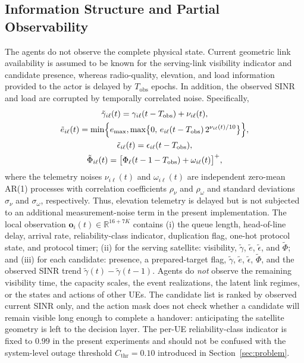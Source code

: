 \documentclass[journal]{IEEEtran}
\begin{document}
\subsection{Information Structure and Partial Observability}
\label{sec:obs}

The agents do not observe the complete physical state. Current geometric link
availability is assumed to be known for the serving-link visibility indicator
and candidate presence, whereas radio-quality, elevation, and load information
provided to the actor is delayed by $T_{\mathrm{obs}}$ epochs. In addition,
the observed SINR and load are corrupted by temporally correlated noise.
Specifically,
\begin{gather}
\tilde\gamma_{i\ell}(t)=\gamma_{i\ell}(t-T_{\mathrm{obs}})+\nu_{i\ell}(t),
\label{eq:telemetry}\\
\tilde e_{i\ell}(t)=\min\!\Big\{e_{\max},\max\!\big\{0,\,e_{i\ell}(t-T_{\mathrm{obs}})\,2^{\nu_{i\ell}(t)/10}\big\}\Big\},\notag\\
\tilde\epsilon_{i\ell}(t)=\epsilon_{i\ell}(t-T_{\mathrm{obs}}),\notag\\
\tilde\Phi_{i\ell}(t)=\big[\Phi_\ell(t-1-T_{\mathrm{obs}})+\omega_{i\ell}(t)\big]^+,\notag
\end{gather}
where the telemetry noises $\nu_{i\ell}(t)$ and $\omega_{i\ell}(t)$ are
independent zero-mean AR(1) processes with correlation coefficients
$\rho_\nu$ and $\rho_\omega$ and standard deviations $\sigma_\nu$ and
$\sigma_\omega$, respectively. Thus, elevation telemetry is delayed but is not
subjected to an additional measurement-noise term in the present
implementation. The local observation $\mathbf{o}_i(t)\in\mathbb{R}^{16+7K}$
contains (i) the queue length, head-of-line delay, arrival rate,
reliability-class indicator, duplication flag, one-hot protocol state, and
protocol timer; (ii) for the serving satellite: visibility, $\tilde\gamma$,
$\tilde e$, $\tilde\epsilon$, and $\tilde\Phi$; and (iii) for each candidate:
presence, a prepared-target flag, $\tilde\gamma$, $\tilde e$,
$\tilde\epsilon$, $\tilde\Phi$, and the observed SINR trend
$\tilde\gamma(t)-\tilde\gamma(t-1)$. Agents do \emph{not} observe the
remaining visibility time, the capacity scales, the event realizations, the
latent link regimes, or the states and actions of other UEs. The candidate
list is ranked by observed current SINR only, and the action mask does not
check whether a candidate will remain visible long enough to complete a
handover: anticipating the satellite geometry is left to the decision layer.
The per-UE reliability-class indicator is fixed to $0.99$ in the present
experiments and should not be confused with the system-level outage threshold
$C_{\mathrm{thr}}=0.10$ introduced in Section~\ref{sec:problem}.
\end{document}
